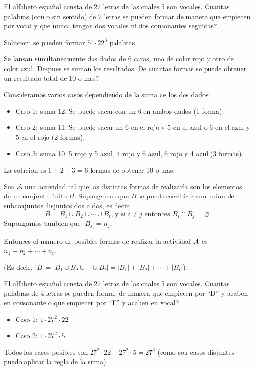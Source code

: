 \begin{example}
	El alfabeto español consta de 27 letras de las cuales 5 son vocales. Cuantas palabras (con o sin sentido) de 7 letras se pueden formar de manera que empiecen por vocal y que nunca tengan dos vocales ni dos consonantes seguidas?
	
	Solucion: se pueden formar \(5^{4} \cdot 22^{3}\) palabras.
\end{example}

\begin{example}
	Se lanzan simultaneamente dos dados de 6 caras, uno de color rojo y otro de color azul. Despues se suman los resultados. De cuantas formas se puede obtener un resultado total de 10 o mas?
	
	Consideramos varios casos dependiendo de la suma de los dos dados:
	\begin{itemize}
		\item Caso 1: suma 12. Se puede sacar con un 6 en ambos dados (1 forma).
		\item Caso 2: suma 11. Se puede sacar un 6 en el rojo y 5 en el azul o 6 en el azul y 5 en el rojo (2 formas).
		\item Caso 3: suma 10. 5 rojo y 5 azul, 4 rojo y 6 azul, 6 rojo y 4 azul (3 formas).
	\end{itemize}
	
	La solucion es \(1 + 2 + 3 = 6 \) formas de obtener 10 o mas.
\end{example}

\begin{proposition}
	Sea \(\mathcal{\MakeUppercase{a}} \) una actividad tal que las distintas formas de realizarla son los elementos de un conjunto finito \(B \). Supongamos que \(B \) se puede escribir como union de subconjuntos disjuntos dos a dos, es decir,
	\[
		B = B_1 \cup B_2 \cup \cdots \cup B_t \text{, y si } i \neq j \text{ entonces } B_i \cap B_j = \varnothing
	\]
	Supongamos tambien que \(|B_j| = n_j \).
	
	Entonces el numero de posibles formas de realizar la actividad \(\mathcal{\MakeUppercase{a}} \) es \(n_1 + n_2 + \cdots + n_t\).
	
	(Es decir, \(|B| = |B_1 \cup B_2 \cup \cdots \cup B_t| = |B_1| + |B_2| + \cdots + |B_t| \)).
\end{proposition}

\begin{example}
	El alfabeto español consta de 27 letras de las cuales 5 son vocales. Cuantas palabras de 4 letras se pueden formar de manera que empiecen por ``D'' y acaben en consonante o que empiecen por ``F'' y acaben en vocal?
	
	\begin{itemize}
		\item Caso 1: \(1 \cdot 27^{2} \cdot 22\).
		\item Caso 2: \(1 \cdot 27^{2} \cdot 5\).
	\end{itemize}
	Todos los casos posibles son \(27^{2} \cdot 22 + 27^{2} \cdot 5 = 27^{3} \) (como son casos disjuntos puedo aplicar la regla de la suma).
\end{example}

